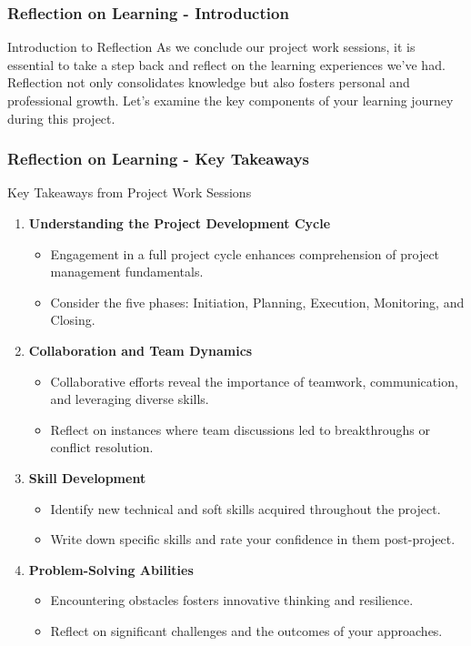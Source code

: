 \documentclass[aspectratio=169]{beamer}
\begin{document}
\begin{frame}[fragile]
    \frametitle{Reflection on Learning - Introduction}
    \begin{block}{Introduction to Reflection}
        As we conclude our project work sessions, it is essential to take a step back and reflect on the learning experiences we've had. Reflection not only consolidates knowledge but also fosters personal and professional growth. Let’s examine the key components of your learning journey during this project.
    \end{block}
\end{frame}

\begin{frame}[fragile]
    \frametitle{Reflection on Learning - Key Takeaways}
    \begin{block}{Key Takeaways from Project Work Sessions}
        \begin{enumerate}
            \item \textbf{Understanding the Project Development Cycle}
            \begin{itemize}
                \item Engagement in a full project cycle enhances comprehension of project management fundamentals.
                \item Consider the five phases: Initiation, Planning, Execution, Monitoring, and Closing.
            \end{itemize}
            
            \item \textbf{Collaboration and Team Dynamics}
            \begin{itemize}
                \item Collaborative efforts reveal the importance of teamwork, communication, and leveraging diverse skills.
                \item Reflect on instances where team discussions led to breakthroughs or conflict resolution.
            \end{itemize}
            
            \item \textbf{Skill Development}
            \begin{itemize}
                \item Identify new technical and soft skills acquired throughout the project.
                \item Write down specific skills and rate your confidence in them post-project.
            \end{itemize}
            
            \item \textbf{Problem-Solving Abilities}
            \begin{itemize}
                \item Encountering obstacles fosters innovative thinking and resilience.
                \item Reflect on significant challenges and the outcomes of your approaches.
            \end{itemize}
        \end{enumerate}
    \end{block}
\end{frame}
\end{document}
